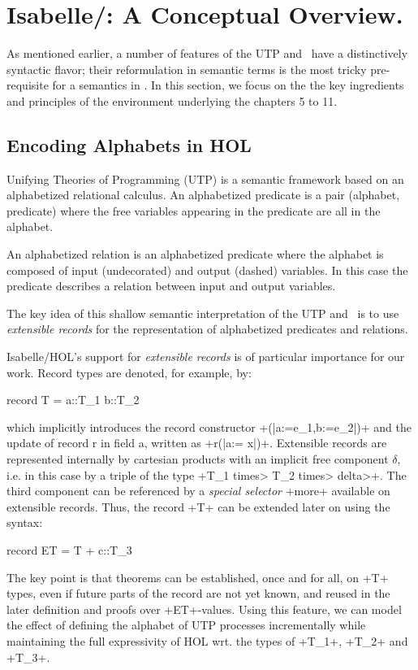 \documentclass[11pt,a4paper]{article}
\begin{document}
\section{\texorpdfstring{Isabelle/\Circus }{Isabelle/Circus}: A Conceptual Overview.}\label{conceptual_overview}
\label{Section:CircusHOL}
As mentioned earlier, a number of features of the UTP and \Circus\ have a distinctively syntactic 
flavor; their reformulation in semantic terms is the most tricky pre-requisite for a semantics in \HOL.
In this section, we focus on the the key ingredients and principles of the environment underlying the
chapters 5 to 11.
   
\subsection{Encoding Alphabets in HOL}\label{sec:Encoding_Alphabets}
Unifying Theories of Programming (UTP) is a semantic framework based on
an alphabetized relational calculus. An alphabetized predicate is a pair (alphabet, predicate)
where the free variables appearing in the predicate are all in the alphabet.

An alphabetized relation is an alphabetized predicate where the alphabet is
composed of input (undecorated) and output (dashed) variables. In this case the
predicate describes a relation between input and output variables.

The key idea of this shallow semantic interpretation of the UTP and \Circus\
is to use \emph{extensible records} for the representation of alphabetized
predicates and relations.

Isabelle/HOL's support for \emph{extensible records} is of particular importance
for our work.
Record types are denoted, for example, by:
\begin{isar}
 record T =  a::T_1
             b::T_2
\end{isar}
which implicitly introduces the record constructor \inlineisar+(|a:=e_1,b:=e_2|)+
and the update of record r in field a, written as \inlineisar+r(|a:= x|)+.
Extensible records are represented internally by cartesian products with an
implicit free component $\delta$, i.e. in this case by a triple of the type
\inlineisar+T_1 \<times> T_2 \<times> \<delta>+. The third component can be referenced
by a \emph{special selector}   \inlineisar+more+ available on extensible records.
Thus, the record \inlineisar+T+ can be
extended later on using the syntax:
\begin{isar}
 record ET =  T +  c::T_3
\end{isar}
The key point is that theorems can be established, once and for all,
on \inlineisar+T+ types, even if future parts of the record are not
yet known, and reused in the later definition and proofs over
\inlineisar+ET+-values.
Using this feature, we can model the effect of defining the
alphabet of UTP processes incrementally while maintaining
the full expressivity of HOL wrt. the types of
\inlineisar+T_1+, \inlineisar+T_2+ and \inlineisar+T_3+.
\end{document}
